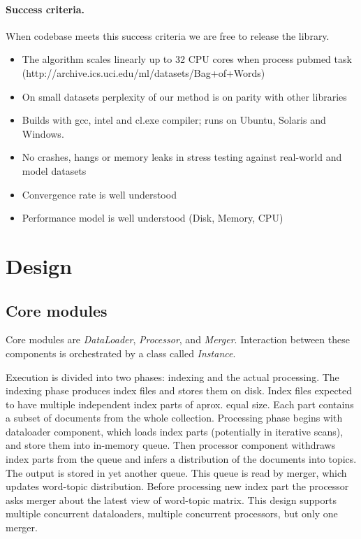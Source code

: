 \documentclass[11pt,a4paper,twoside]{report}
\begin{document}
\paragraph{Success criteria.}
When codebase meets this success criteria we are free to release the library.
\begin{itemize}
    \item The algorithm scales linearly up to 32 CPU cores when process pubmed task (http://archive.ics.uci.edu/ml/datasets/Bag+of+Words)
    \item On small datasets perplexity of our method is on parity with other libraries
    \item Builds with gcc, intel and cl.exe compiler; runs on Ubuntu, Solaris and Windows.
    \item No crashes, hangs or memory leaks in stress testing against real-world and model datasets
    \item Convergence rate is well understood
    \item Performance model is well understood (Disk, Memory, CPU)
\end{itemize}

\section{Design}

\subsection{Core modules}

Core modules are \emph{DataLoader}, \emph{Processor}, and \emph{Merger}.
Interaction between these components is orchestrated by a class called \emph{Instance}.

Execution is divided into two phases: indexing and the actual processing. 
The indexing phase produces index files and stores them on disk. 
Index files expected to have multiple independent index parts of aprox. equal size. 
Each part contains a subset of documents from the whole collection. 
Processing phase begins with dataloader component, which loads index parts
(potentially in iterative scans), and store them into in-memory queue. 
Then processor component withdraws index parts from the queue
and infers a distribution of the documents into topics.
The output is stored in yet another queue. 
This queue is read by merger, which updates word-topic distribution.
Before processing new index part the processor asks merger about the latest view of word-topic matrix.
This design supports multiple concurrent dataloaders, multiple concurrent processors, but only one merger. 
\end{document}
